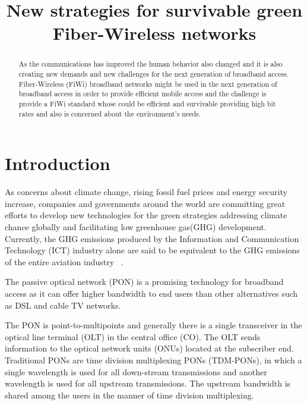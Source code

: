 \documentclass[conference,compsoc]{IEEEtran}
\begin{document}
\title{New strategies for survivable green Fiber-Wireless networks}

\author{
}
\maketitle

\begin{abstract}
As the communications has improved the human behavior also changed and it is also creating new demands and new challenges for the next generation of broadband access.
Fiber-Wireless (FiWi) broadband networks might be used in the next generation of broadband access in order to provide efficient mobile access and the challenge is provide a FiWi standard whose could be efficient and survivable providing high bit rates  and  also is concerned  about  the environment's needs.
\end{abstract}

\IEEEpeerreviewmaketitle

\section{Introduction}

As concerns about climate change, rising fossil fuel prices and energy security increase, companies 
and governments around the world are committing great efforts to develop new technologies for the 
green strategies addressing climate chance globally and facilitating low greenhouse gas(GHG) 
development. Currently, the GHG emissions produced by the Information and Communication Technology 
(ICT) industry alone are said to be equivalent to the GHG emissions of the entire aviation industry 
~\cite{yu2012green}.


The passive optical network (PON) is a promising technology for broadband access as it can offer 
higher bandwidth to end users than other alternatives such as DSL and cable TV networks. 

The PON is point-to-multipoints and generally there is a single transceiver in the optical line 
terminal (OLT) in the central office (CO). The OLT sends information to the optical network units 
(ONUs) located at the subscriber end.
Traditional PONs are time division multiplexing PONs (TDM-PONs), in which a single wavelength is 
used for all down-stream transmissions and another wavelength is used for all upstream 
transmissions. The upstream bandwidth is shared among the users in the manner of time division 
multiplexing.
\end{document}
